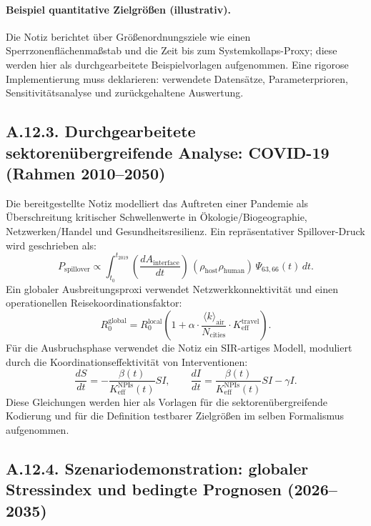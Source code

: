 \documentclass[13pt,a4paper]{article}
\begin{document}
	\paragraph{Beispiel quantitative Zielgrößen (illustrativ).}
	Die Notiz berichtet über Größenordnungsziele wie einen Sperrzonenflächenmaßstab und die Zeit bis zum Systemkollaps-Proxy; diese werden hier als durchgearbeitete Beispielvorlagen aufgenommen. Eine rigorose Implementierung muss deklarieren: verwendete Datensätze, Parameterprioren, Sensitivitätsanalyse und zurückgehaltene Auswertung.
	
	\subsection*{A.12.3. Durchgearbeitete sektorenübergreifende Analyse: COVID-19 (Rahmen 2010--2050)}
	
	Die bereitgestellte Notiz modelliert das Auftreten einer Pandemie als Überschreitung kritischer Schwellenwerte in Ökologie/Biogeographie, Netzwerken/Handel und Gesundheitsresilienz. Ein repräsentativer Spillover-Druck wird geschrieben als:
	$$ P_{\mathrm{spillover}} \propto \int_{t_0}^{t_{2019}}
	\left(\frac{dA_{\mathrm{interface}}}{dt}\right)\,
	\left(\rho_{\mathrm{host}}\rho_{\mathrm{human}}\right)\,
	\Psi_{63,66}(t)\,dt. $$
	Ein globaler Ausbreitungsproxi verwendet Netzwerkkonnektivität und einen operationellen Reisekoordinationsfaktor:
	$$ R_0^{\mathrm{global}} = R_0^{\mathrm{local}}\left(1+\alpha\cdot \frac{\langle k\rangle_{\mathrm{air}}}{N_{\mathrm{cities}}}\cdot K_{\mathrm{eff}}^{\mathrm{travel}}\right). $$
	Für die Ausbruchsphase verwendet die Notiz ein SIR-artiges Modell, moduliert durch die Koordinationseffektivität von Interventionen:
	$$ \frac{dS}{dt} = - \frac{\beta(t)}{K_{\mathrm{eff}}^{\mathrm{NPIs}}(t)}SI,\qquad
	\frac{dI}{dt} = \frac{\beta(t)}{K_{\mathrm{eff}}^{\mathrm{NPIs}}(t)}SI - \gamma I. $$
	Diese Gleichungen werden hier als Vorlagen für die sektorenübergreifende Kodierung und für die Definition testbarer Zielgrößen im selben Formalismus aufgenommen.
	
	\subsection*{A.12.4. Szenariodemonstration: globaler Stressindex und bedingte Prognosen (2026--2035)}
	
\end{document}
